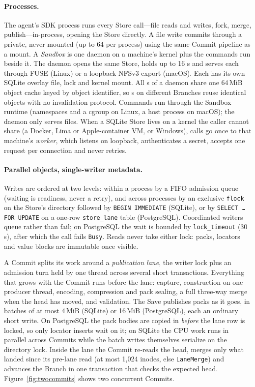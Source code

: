 \paragraph{Processes.} The agent's SDK process runs every Store call---file reads and
writes, fork, merge, publish---in-process, opening the Store directly. A file write
commits through a private, never-mounted \ws{} (up to 64 per process) using the same
Commit pipeline as a mount. A \emph{Sandbox} is one daemon on a machine's kernel plus the
commands run beside it. The daemon opens the same Store, holds up to 16 \ws{}s and
serves each through FUSE (Linux) or a loopback NFSv3 export (macOS). Each \ws{} has its
own SQLite overlay file, lock and kernel mount. All \ws{}s of a daemon share one 64\,MiB
object cache keyed by object identifier, so \ws{}s on different Branches reuse identical
objects with no invalidation protocol. Commands run through the Sandbox runtime
(namespaces and a cgroup on Linux, a host process on macOS); the daemon only serves
files. When a SQLite Store lives on a kernel the caller cannot share (a Docker, Lima or
Apple-container VM, or Windows), calls go once to that machine's \emph{worker}, which
listens on loopback, authenticates a secret, accepts one request per connection and
never retries.

\paragraph{Parallel objects, single-writer metadata.} Writes are ordered at two levels:
within a process by a FIFO admission queue (waiting is readiness, never a retry), and
across processes by an exclusive \texttt{flock} on the Store's directory followed by
\texttt{BEGIN IMMEDIATE} (SQLite), or by \texttt{SELECT \ldots{} FOR UPDATE} on a one-row
\texttt{store\_lane} table (PostgreSQL). Coordinated writers queue rather than fail; on
PostgreSQL the wait is bounded by \texttt{lock\_timeout} (30\,s), after which the call
fails \texttt{Busy}. Reads never take either lock: packs, locators and value blocks are
immutable once visible.

A Commit splits its work around a \emph{publication lane}, the writer lock plus an
admission turn held by one thread across several short transactions. Everything that
grows with the Commit runs before the lane: capture, construction on one producer
thread, encoding, compression and pack sealing, a full three-way merge when the head has
moved, and validation. The Save publishes packs as it goes, in batches of at most
4\,MiB (SQLite) or 16\,MiB (PostgreSQL), each an ordinary short write. On PostgreSQL the
pack bodies are copied in \emph{before} the lane row is locked, so only locator inserts
wait on it; on SQLite the CPU work runs in parallel across Commits while the batch
writes themselves serialize on the directory lock. Inside the lane the Commit re-reads
the head, merges only what landed since its pre-lane read (at most 1,024 inodes, else
\texttt{LaneMerge}) and advances the Branch in one transaction that checks the expected
head. Figure~\ref{fig:twocommits} shows two concurrent Commits.

